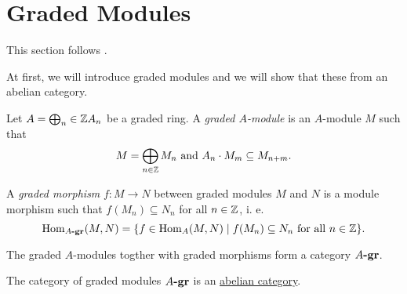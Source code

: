\section{Graded Modules}

This section follows \cite[chapter 1 and 2]{gradedrings}.

At first, we will introduce graded modules and we will show that these from an abelian category.

\begin{definition}
    Let $A=\bigoplus_n\in{\mathbb Z} A_n$ be a graded ring.
    A \textit{graded $A$-module} is an $A$-module $M$ such that $$M=\bigoplus_{n\in{\mathbb Z}} M_n \text{ and } A_n\cdot M_m \subseteq M_{n+m}.$$

    A \textit{graded morphism} $f:M \rightarrow N$ between graded modules $M$ and $N$ is a module morphism such that $f(M_n)\subseteq N_n$ for all $n \in {\mathbb Z}$, i. e. $$\operatorname{Hom}_{A\textrm{\textup{\textbf{-gr}}}}(M,N)=\{f\in\operatorname{Hom}_A(M,N) \;\vert\; f(M_n)\subseteq N_n \text{ for all } n \in {\mathbb Z}\}.$$

    The graded $A$-modules togther with graded morphisms form a category $A\textrm{\textup{\textbf{-gr}}}$.
\end{definition}

\begin{lemma}
    The category of graded modules $A\textrm{\textup{\textbf{-gr}}}$ is an \hyperref[def:abCat]{abelian category}.
\end{lemma}

